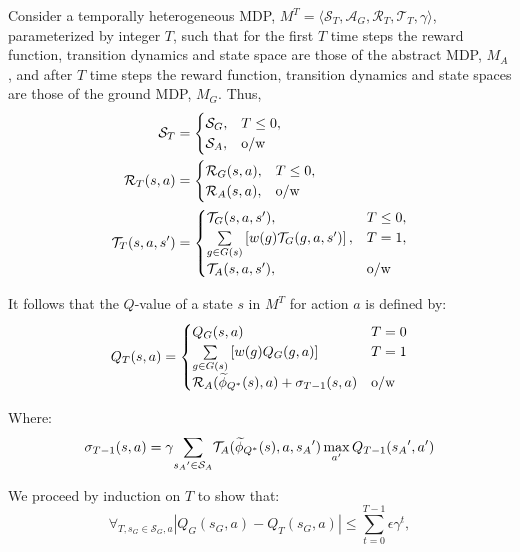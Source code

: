 Consider a temporally heterogeneous \ac{MDP}, $M^T = \langle \mathcal{S}_T, \mathcal{A}_G, \mathcal{R}_T, \mathcal{T}_T, \gamma \rangle$, parameterized by integer $T$, such that for the first $T$ time steps the reward function, transition dynamics and state space are those of the abstract MDP, $M_A$, and after $T$ time steps the reward function, transition dynamics and state spaces are those of the ground MDP, $M_G$. Thus,
\begin{align*}
\mathcal{S}_T &= \begin{cases}
\mathcal{S}_G,& T \leq 0, \\
\mathcal{S}_A,& \text{o/w}
\end{cases}\\
\mathcal{R}_T(s,a) &= \begin{cases}
\mathcal{R}_G(s,a),& T \leq 0, \\
\mathcal{R}_A(s, a),& \text{o/w}
\end{cases}\\
\mathcal{T}_T(s,a,s') &= \begin{cases}
\mathcal{T}_G(s,a,s'),& T \leq 0, \\
\underset{{g \in G(s)}}{\sum}\left[w(g)\mathcal{T}_G(g, a, s')\right],& T = 1, \\
\mathcal{T}_A(s,a,s'),& \text{o/w}
\end{cases}\\
\end{align*}

It follows that the $Q$-value of a state $s$ in $M^T$ for action $a$ is defined by:
\begin{equation}
Q_T(s, a) = 
\begin{cases}
	   Q_G(s, a) &  T=0\\
	   \underset{g \in G(s)}{\sum} \left[ w(g)Q_G(g,a) \right] & T = 1\\
	   \mathcal{R}_A(\widetilde \phi_{Q^*}(s),a) + \sigma_{T-1}(s,a) &\text{o/w}

\end{cases}
\end{equation}

Where:
\begin{equation}
\sigma_{T-1}(s,a) = \gamma \underset{{s_A}' \in \mathcal{S}_A}{\sum} \mathcal{T}_A(\widetilde \phi_{Q^*}(s),a,{s_A}') \max_{a'} Q_{T-1}({s_A}', a')
\end{equation}

We proceed by induction on $T$ to show that:
\begin{equation}
\forall_{T, s_G \in \mathcal{S}_G, a} |Q_G(s_G, a) - Q_T(s_G, a)| \leq \sum_{t=0}^{T-1} \epsilon \gamma^{t},
\end{equation}

